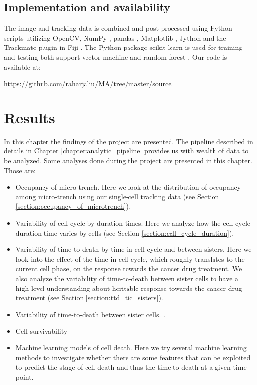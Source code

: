 \documentclass[pdftex,12pt,a4paper]{report}
\begin{document}
\section{Implementation and availability}

The image and tracking data is combined and post-processed using Python scripts utilizing OpenCV\cite{bradski2008learning}, NumPy \cite{walt2011numpy}, pandas \cite{mckinney2010data}, Matplotlib \cite{hunter2007matplotlib}, Jython and the Trackmate \cite{tinevez2017trackmate, pedroni2002jython} plugin in Fiji \cite{schindelin2012fiji}. The Python package scikit-learn is used for training and testing both support vector machine and random forest \cite{scikit-learn}. Our code is available at:

\href{https://github.com/raharjaliu/MA/tree/master/source}{https://github.com/raharjaliu/MA/tree/master/source}.

\chapter{Results}

In this chapter the findings of the project are presented. The pipeline described in details in Chapter \ref{chapter:analytic_pipeline} provides us with wealth of data to be analyzed. Some analyses done during the project are presented in this chapter. Those are:

\begin{itemize}
\item Occupancy of micro-trench. Here we look at the distribution of occupancy among micro-trench using our single-cell tracking data (see Section \ref{section:occupancy_of_microtrench}).
\item Variability of cell cycle by duration times. Here we analyze how the cell cycle duration time varies by cells (see Section \ref{section:cell_cycle_duration}).
\item Variability of time-to-death by time in cell cycle and between sisters.  Here we look into the effect of the time in cell cycle, which roughly translates to the current cell phase, on the response towards the cancer drug treatment. We also analyze the variability of time-to-death between sister cells to have a high level understanding about heritable response towards the cancer drug treatment  (see Section \ref{section:ttd_tic_sisters}).
\item Variability of time-to-death between sister cells. .
\item Cell survivability 
\item Machine learning models of cell death. Here we try several machine learning methods to investigate whether there are some features that can be exploited to predict the stage of cell death and thus the time-to-death at a given time point.
\end{itemize}
\end{document}
